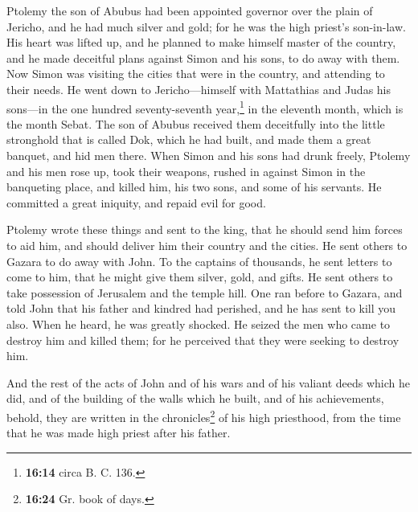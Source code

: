  Ptolemy the son of Abubus had been appointed governor
over the plain of Jericho, and he had much silver and gold;
 for he was the high priest's son-in-law. 
His heart was lifted up, and he planned to make himself master of the
country, and he made deceitful plans against Simon and his sons, to do
away with them.  Now Simon was visiting the cities that
were in the country, and attending to their needs. He went down to
Jericho---himself with Mattathias and Judas his sons---in the one
hundred seventy-seventh year,\footnote{\textbf{16:14} circa B. C. 136.}
in the eleventh month, which is the month Sebat.  The son
of Abubus received them deceitfully into the little stronghold that is
called Dok, which he had built, and made them a great banquet, and hid
men there.  When Simon and his sons had drunk freely,
Ptolemy and his men rose up, took their weapons, rushed in against Simon
in the banqueting place, and killed him, his two sons, and some of his
servants.  He committed a great iniquity, and repaid evil
for good.

 Ptolemy wrote these things and sent to the king, that he
should send him forces to aid him, and should deliver him their country
and the cities.  He sent others to Gazara to do away with
John. To the captains of thousands, he sent letters to come to him, that
he might give them silver, gold, and gifts.  He sent
others to take possession of Jerusalem and the temple hill.
 One ran before to Gazara, and told John that his father
and kindred had perished, and he has sent to kill you also.
 When he heard, he was greatly shocked. He seized the men
who came to destroy him and killed them; for he perceived that they were
seeking to destroy him.

 And the rest of the acts of John and of his wars and of
his valiant deeds which he did, and of the building of the walls which
he built, and of his achievements,  behold, they are
written in the chronicles\footnote{\textbf{16:24} Gr. book of days.} of
his high priesthood, from the time that he was made high priest after
his father.
